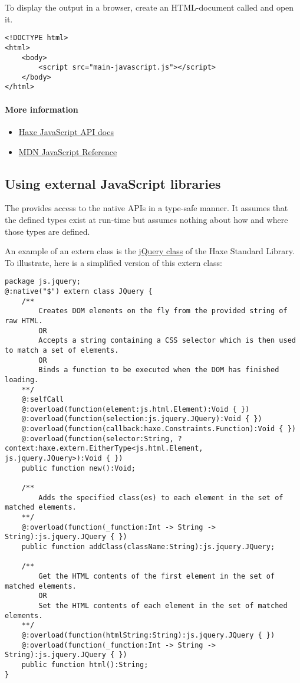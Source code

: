 To display the output in a browser, create an HTML-document called  and open it.

\begin{lstlisting}
<!DOCTYPE html>
<html>
	<body>
		<script src="main-javascript.js"></script>
	</body>
</html>
\end{lstlisting}

\paragraph{More information}

\begin{itemize}
	\item \href{http://api.haxe.org/js/}{Haxe JavaScript API docs}
	\item \href{https://developer.mozilla.org/en-US/docs/Web/JavaScript/Reference}{MDN JavaScript Reference}
\end{itemize}

\subsection{Using external JavaScript libraries}
\label{target-javascript-external-libraries}

The  provides access to the native APIs in a type-safe manner. It assumes that the defined types exist at run-time but assumes nothing about how and where those types are defined. 

An example of an extern class is the \href{https://github.com/HaxeFoundation/haxe/blob/development/std/js/jquery/JQuery.hx}{jQuery class} of the Haxe Standard Library. 
To illustrate, here is a simplified version of this extern class:

\begin{lstlisting}
package js.jquery;
@:native("$") extern class JQuery {
	/**
		Creates DOM elements on the fly from the provided string of raw HTML.
		OR
		Accepts a string containing a CSS selector which is then used to match a set of elements.
		OR
		Binds a function to be executed when the DOM has finished loading.
	**/
	@:selfCall
	@:overload(function(element:js.html.Element):Void { })
	@:overload(function(selection:js.jquery.JQuery):Void { })
	@:overload(function(callback:haxe.Constraints.Function):Void { })
	@:overload(function(selector:String, ?context:haxe.extern.EitherType<js.html.Element, js.jquery.JQuery>):Void { })
	public function new():Void;

	/**
		Adds the specified class(es) to each element in the set of matched elements.
	**/
	@:overload(function(_function:Int -> String -> String):js.jquery.JQuery { })
	public function addClass(className:String):js.jquery.JQuery;

	/**
		Get the HTML contents of the first element in the set of matched elements.
		OR
		Set the HTML contents of each element in the set of matched elements.
	**/
	@:overload(function(htmlString:String):js.jquery.JQuery { })
	@:overload(function(_function:Int -> String -> String):js.jquery.JQuery { })
	public function html():String;
}
\end{lstlisting}

